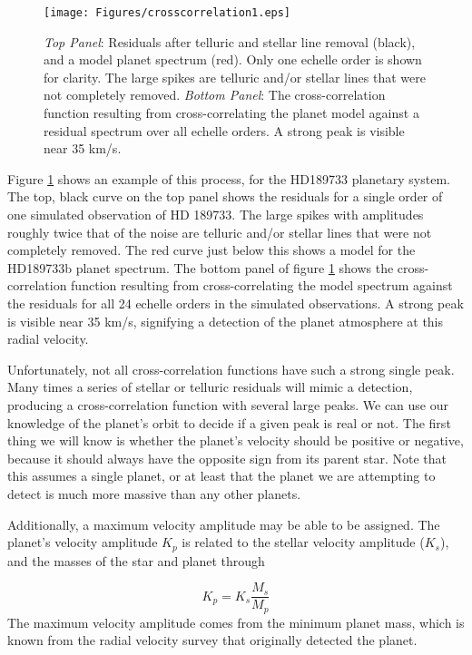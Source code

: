 \documentclass[11pt]{report}     %
\begin{document}
\begin{figure}[ht]
  \centering
  \texttt{[image: Figures/crosscorrelation1.eps]}
  \caption{\emph{Top Panel}: Residuals after telluric and stellar line
  removal (black), and a model planet spectrum (red). Only one echelle
order is shown for clarity. The large spikes are telluric and/or
stellar lines that were not completely removed. \emph{Bottom Panel}:
The cross-correlation function resulting from cross-correlating the
planet model against a residual spectrum 
over all echelle orders. A strong peak is visible near 35 km/s.}
  \label{fig:correx1}
\end{figure}

Figure \ref{fig:correx1} shows an example of this process, for the
HD189733 planetary system. The top, black curve on the top panel shows
the residuals for a single order of one simulated observation of HD
189733. The large spikes with amplitudes roughly twice that of the
noise are telluric and/or stellar lines that were not completely
removed. The red curve just below this shows a model for the HD189733b
planet spectrum. The bottom panel of figure \ref{fig:correx1} shows the
cross-correlation function resulting from cross-correlating the model
spectrum against the residuals for all 24 echelle orders in the
simulated observations. A strong peak is visible near 35 km/s,
signifying a detection of the planet atmosphere at this radial
velocity. 

Unfortunately, not all cross-correlation functions have such a strong 
single peak. Many times a series of stellar or telluric residuals will 
mimic a detection, producing a cross-correlation function with several large peaks. We can use our knowledge of the planet's orbit to decide
if a given peak is real or not. The first thing we will know is
whether the planet's velocity should be positive or negative, because
it should always have the opposite sign from its parent
star. Note that this assumes a single planet, or at least that the 
planet we are attempting to detect is much more massive than any other
planets.

Additionally, a maximum velocity amplitude may be able to be
assigned. The planet's velocity amplitude $K_p$ is related to the
stellar velocity amplitude ($K_s$), and the masses of the star and
planet through

\begin{equation}
K_p = K_s \frac{M_s}{M_p}
\label{eqn:massdet}
\end{equation}
The maximum velocity amplitude comes from the minimum planet mass,
which is known from the radial velocity survey that originally
detected the planet. 
\end{document}
